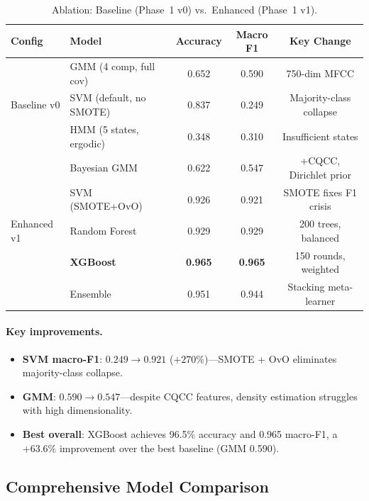\documentclass[11pt,a4paper]{article}
\begin{document}
\begin{table}[H]
\centering
\caption{Ablation: Baseline (Phase~1 v0) vs.\ Enhanced (Phase~1 v1).}
\label{tab:ablation}
\begin{tabular}{llccc}
\toprule
\textbf{Config} & \textbf{Model} & \textbf{Accuracy} & \textbf{Macro F1} & \textbf{Key Change} \\
\midrule
\multirow{3}{*}{Baseline v0}
  & GMM (4 comp, full cov) & 0.652 & 0.590 & 750-dim MFCC \\
  & SVM (default, no SMOTE) & 0.837 & 0.249 & Majority-class collapse \\
  & HMM (5 states, ergodic) & 0.348 & 0.310 & Insufficient states \\
\midrule
\multirow{5}{*}{Enhanced v1}
  & Bayesian GMM       & 0.622 & 0.547 & +CQCC, Dirichlet prior \\
  & SVM (SMOTE+OvO)    & 0.926 & 0.921 & SMOTE fixes F1 crisis \\
  & Random Forest       & 0.929 & 0.929 & 200 trees, balanced \\
  & \textbf{XGBoost}   & \textbf{0.965} & \textbf{0.965} & 150 rounds, weighted \\
  & Ensemble           & 0.951 & 0.944 & Stacking meta-learner \\
\bottomrule
\end{tabular}
\end{table}

\paragraph{Key improvements.}
\begin{itemize}[nosep]
  \item \textbf{SVM macro-F1}: $0.249 \rightarrow 0.921$
        ($+270\%$)---SMOTE + OvO eliminates majority-class collapse.
  \item \textbf{GMM}: $0.590 \rightarrow 0.547$---despite CQCC features,
        density estimation struggles with high dimensionality.
  \item \textbf{Best overall}: XGBoost achieves 96.5\% accuracy and
        0.965 macro-F1, a $+63.6\%$ improvement over the best
        baseline (GMM 0.590).
\end{itemize}

\subsection{Comprehensive Model Comparison}
\end{document}
